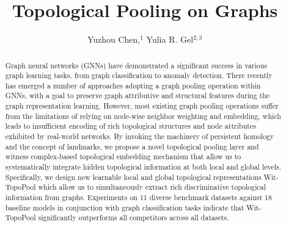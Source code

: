 \documentclass[letterpaper]{article} %
\title{Topological Pooling on Graphs}
\author{
Yuzhou Chen,$^1$
Yulia R. Gel$^{2,3}$
}
\begin{document}
\maketitle

\begin{abstract}
Graph neural networks (GNNs) have demonstrated a significant success in various graph learning tasks, from graph classification to anomaly detection. There recently has emerged a number of approaches adopting a graph pooling operation within GNNs, with a goal to preserve graph attributive and structural features during the graph representation learning. However, most existing graph pooling operations suffer from the limitations of relying on node-wise neighbor weighting and embedding, which leads to insufficient encoding of rich topological structures and node attributes exhibited by real-world networks. By invoking the machinery of persistent homology and the concept of landmarks, we propose a novel topological pooling layer and witness complex-based topological embedding mechanism that allow us to systematically integrate hidden topological information at both local and global levels. Specifically, we design new learnable local and global topological representations Wit-TopoPool which allow us to simultaneously extract rich discriminative topological information from graphs. Experiments on 11 diverse benchmark datasets against 18 baseline models in conjunction with graph classification tasks indicate that Wit-TopoPool significantly outperforms all competitors across all datasets.%


\end{abstract}
\end{document}
